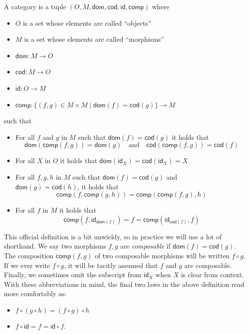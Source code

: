 \begin{definition}[Category]
  \label{def:category}
  \sloppy
  A category is a tuple \((O,M,\mathsf{dom},\mathsf{cod},\mathsf{id},\mathsf{comp})\)
  where
  \begin{itemize}[noitemsep]
  \item $O$ is a set whose elements are called ``objects''
  \item $M$ is a set whose elements are called ``morphisms''
  \item $\mathsf{dom} : M\to O$
  \item $\mathsf{cod} : M \to O$
  \item $\mathsf{id} : O\to M$
  \item $\mathsf{comp} : \{(f,g) \in M \times M \mid \mathsf{dom}(f) = \mathsf{cod}(g)\} \to M$
  \end{itemize}
  such that
  \begin{itemize}[noitemsep]
  \item For all \(f\) and \(g\) in \(M\) such that \(\mathsf{dom}(f) = \mathsf{cod}(g)\)
    it holds that
    \[
    \mathsf{dom}(\mathsf{comp}(f,g)) = \mathsf{dom}(g)
    \quad\text{and}\quad
    \mathsf{cod}(\mathsf{comp}(f,g)) = \mathsf{cod}(f)
    \]
  \item For all \(X\) in \(O\) it holds that \(\mathsf{dom}(\mathsf{id}_X) = \mathsf{cod}(\mathsf{id}_X) = X\)
  \item For all $f,g,h$ in $M$ such that
  $\mathsf{dom}(f) = \mathsf{cod}(g)$ and\\
  $\mathsf{dom}(g) = \mathsf{cod}(h)$, it holds that
  $$\mathsf{comp}(f,\mathsf{comp}(g,h)) = \mathsf{comp}(\mathsf{comp}(f,g),h)$$
  \item For all $f$ in $M$ it holds that $$\mathsf{comp}(f,\mathsf{id}_{\mathsf{dom}(f)})=f=\mathsf{comp}(\mathsf{id}_{\mathsf{cod}(f)}, f)$$
  \end{itemize}
\end{definition}
This official definition is a bit unwieldy,
so in practice we will use a lot of shorthand.
We say two morphisms \(f,g\) are \emph{composable} if \(\mathsf{dom}(f) = \mathsf{cod}(g)\).
The composition \(\mathsf{comp}(f,g)\) of two composable morphisms will be written \(f \circ g\).
If we ever write \(f \circ g\), it will be tacitly assumed that \(f\) and \(g\) are composable.
Finally, we sometimes omit the subscript from \(\mathsf{id}_X\) when \(X\) is clear from context.
With these abbreviations in mind, the final two laws in the above definition read more comfortably as:
\begin{itemize}
\item \(f \circ (g \circ h) = (f \circ g) \circ h\)
\item \(f \circ \mathsf{id} = f = \mathsf{id} \circ f\).
\end{itemize}

